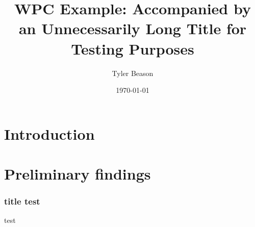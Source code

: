 \documentclass{beamer}
\title[WPC Example]{WPC Example: Accompanied by an Unnecessarily Long Title for Testing Purposes}
\author{Tyler Beason}
\date{\today}
\begin{document}
\section{Introduction}

\begin{frame}
\titlepage
\end{frame}



\section{Preliminary findings}
\begin{frame}
	\frametitle{title test}
test

\end{frame}
\end{document}
